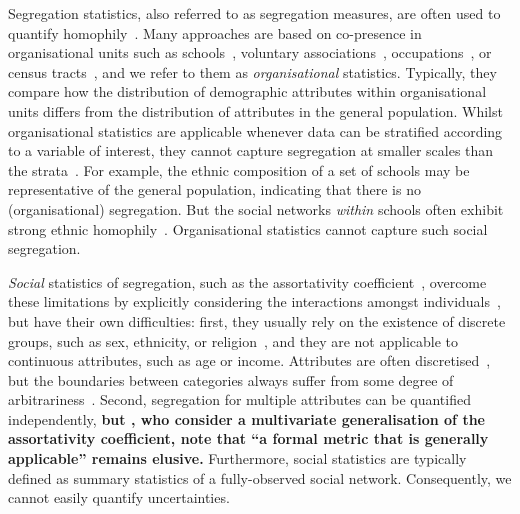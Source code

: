 \documentclass{scrartcl}
\newcommand{\change}[1]{\textbf{#1}}
\begin{document}
\begin{refsection}
Segregation statistics, also referred to as segregation measures, are often used to quantify homophily~\cite{Rodriguez-Moral2016, Bojanowski2014}. Many approaches are based on co-presence in organisational units such as schools~\cite{Orfield2014}, voluntary associations~\cite{Popielarz1999}, occupations~\cite{Charles1995}, or census tracts~\cite{Reardon2004}, and we refer to them as \emph{organisational} statistics. Typically, they compare how the distribution of demographic attributes within organisational units differs from the distribution of attributes in the general population. Whilst organisational statistics are applicable whenever data can be stratified according to a variable of interest, they cannot capture segregation at smaller scales than the strata~\cite{Blumenstock2013}. For example, the ethnic composition of a set of schools may be representative of the general population, indicating that there is no (organisational) segregation. But the social networks \emph{within} schools often exhibit strong ethnic homophily~\cite{Currarini2009,Moody2001}. Organisational statistics cannot capture such social segregation.

\emph{Social} statistics of segregation, such as the assortativity coefficient~\cite{Newman2003a}, overcome these limitations by explicitly considering the interactions amongst individuals~\cite{Blumenstock2013}, but have their own difficulties: first, they usually rely on the existence of discrete groups, such as sex, ethnicity, or religion~\cite{Bojanowski2014}, and they are not applicable to continuous attributes, such as age or income. Attributes are often discretised~\cite{Lam-Morgan2012, Kalmijn2007, Kim2012}, but the boundaries between categories always suffer from some degree of arbitrariness~\cite{Reardon2004}. Second, segregation for multiple attributes can be quantified independently, \change{but \textcite{Pelechrinis2016}, who consider a multivariate generalisation of the assortativity coefficient, note that ``a formal metric that is generally applicable'' remains elusive.} Furthermore, social statistics are typically defined as summary statistics of a fully-observed social network. Consequently, we cannot easily quantify uncertainties.


\end{refsection}
\end{document}
